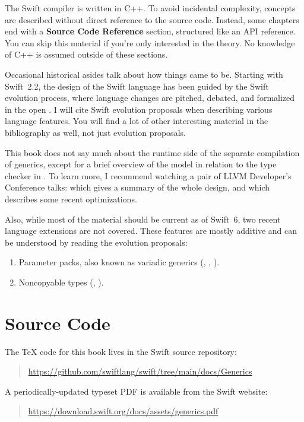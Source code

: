 \documentclass[../generics]{subfiles}
\begin{document}
The Swift compiler is written in C++. To avoid incidental complexity, concepts are described without direct reference to the source code. Instead, some chapters end with a \textbf{Source Code Reference} section, structured like an API reference. You can skip this material if you're only interested in the theory. No knowledge of C++ is assumed outside of these sections.

Occasional historical asides talk about how things came to be. Starting with Swift~2.2, the design of the Swift language has been guided by the Swift evolution process, where language changes are pitched, debated, and formalized in the open \cite{evolution}. I will cite Swift evolution proposals when describing various language features. You will find a lot of other interesting material in the bibliography as well, not just evolution proposals.

This book does not say much about the runtime side of the separate compilation of generics, except for a brief overview of the model in relation to the type checker in . To learn more, I recommend watching a pair of LLVM Developer's Conference talks: \cite{llvmtalk} which gives a summary of the whole design, and \cite{cvwtalk} which describes some recent optimizations.

Also, while most of the material should be current as of Swift~6, two recent language extensions are not covered. These features are mostly additive and can be understood by reading the evolution proposals:
\begin{enumerate}
\item {}Parameter packs, also known as variadic generics (\cite{se0393}, \cite{se0398}, \cite{se0399}).
\item {}Noncopyable types (\cite{se0390}, \cite{se0427}).
\end{enumerate}

\section*{Source Code}

The \TeX{} code for this book lives in the Swift source repository:
\begin{quote}
\url{https://github.com/swiftlang/swift/tree/main/docs/Generics}
\end{quote}
A periodically-updated typeset PDF is available from the Swift website:
\begin{quote}
\url{https://download.swift.org/docs/assets/generics.pdf}
\end{quote}
\end{document}
